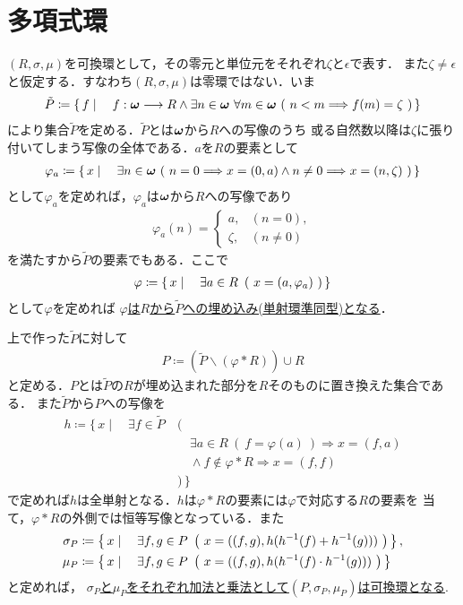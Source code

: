 \section{多項式環}
	$(R,\sigma,\mu)$を可換環として，その零元と単位元をそれぞれ$\zeta$と$\epsilon$で表す．
	また$\zeta \neq \epsilon$と仮定する．すなわち$(R,\sigma,\mu)$は零環ではない．いま
	\begin{align}
		\tilde{P} \coloneqq \left\{\, f \mid \quad f:{\boldsymbol \omega} \longrightarrow R \wedge 
		\exists n \in {\boldsymbol \omega}\ \forall m \in {\boldsymbol \omega}\ (\ n < m \Longrightarrow f(m) = \zeta\ )\, \right\}
	\end{align}
	により集合$\tilde{P}$を定める．$\tilde{P}$とは${\boldsymbol \omega}$から$R$への写像のうち
	或る自然数以降は$\zeta$に張り付いてしまう写像の全体である．$a$を$R$の要素として
	\begin{align}
		\varphi_a \coloneqq \left\{\, x \mid \quad \exists n \in {\boldsymbol \omega}\ (\ n = 0 \Longrightarrow x = (0,a)
		\wedge n \neq 0 \Longrightarrow x = (n,\zeta)\ )\, \right\}
	\end{align}
	として$\varphi_a$を定めれば，$\varphi_a$は${\boldsymbol \omega}$から$R$への写像であり
	\begin{align}
		\varphi_a(n) = 
		\begin{cases}
			a, & (n=0), \\
			\zeta, & (n \neq 0)
		\end{cases}
	\end{align}
	を満たすから$\tilde{P}$の要素でもある．ここで
	\begin{align}
		\varphi \coloneqq \Set{x}{\exists a \in R\ \left(\ x=(a,\varphi_a)\ \right)}
	\end{align}
	として$\varphi$を定めれば
	\underline{$\varphi$は$R$から$\tilde{P}$への埋め込み(単射環準同型)となる}．
	
	\begin{prf}
	\end{prf}
	
	上で作った$\tilde{P}$に対して
	\begin{align}
		P \coloneqq \left( \tilde{P} \backslash (\varphi \ast R) \right) \cup R
	\end{align}
	と定める．$P$とは$\tilde{P}$の$R$が埋め込まれた部分を$R$そのものに置き換えた集合である．
	また$\tilde{P}$から$P$への写像を
	\begin{align}
		h \coloneqq \{\, x \mid \quad \exists f \in \tilde{P}\ 
		&(\\
		&\quad \exists a \in R\ (\ f = \varphi(a)\ ) \Longrightarrow x = (f,a) \\
		&\quad \wedge f \notin \varphi \ast R \Longrightarrow x = (f,f)\\
		&)\, \}
	\end{align}
	で定めれば$h$は全単射となる．$h$は$\varphi \ast R$の要素には$\varphi$で対応する$R$の要素を
	当て，$\varphi \ast R$の外側では恒等写像となっている．また
	\begin{align}
		\sigma_P &\coloneqq \Set{x}{\exists f,g \in P\ \left(\ 
			x=((f,g),h(h^{-1}(f)+h^{-1}(g)))\ \right)}, \\
		\mu_P &\coloneqq \Set{x}{\exists f,g \in P\ \left(\ 
			x=((f,g),h(h^{-1}(f) \cdot h^{-1}(g)))\ \right)}
	\end{align}
	と定めれば，
	\underline{$\sigma_P$と$\mu_P$をそれぞれ加法と乗法として$(P,\sigma_P,\mu_P)$は可換環となる}.
	
